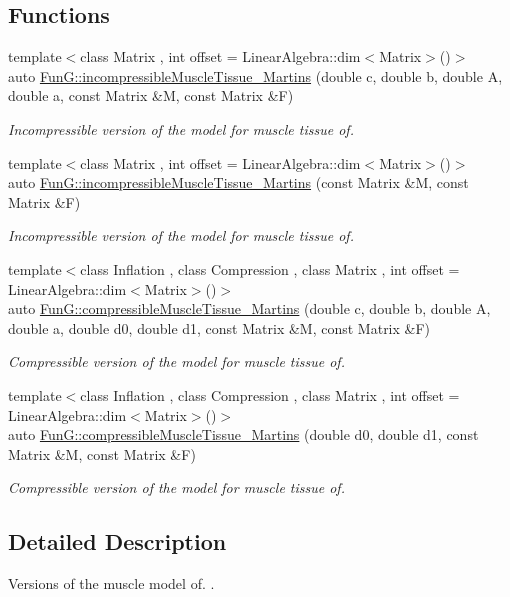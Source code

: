 \subsection*{\-Functions}
\begin{DoxyCompactItemize}
\item 
{\footnotesize template$<$class Matrix , int offset = \-Linear\-Algebra\-::dim$<$\-Matrix$>$()$>$ }\\auto \hyperlink{group__Biomechanics_gafcc36a1958899ca9246c4c1b3c9bfd85}{\-Fun\-G\-::incompressible\-Muscle\-Tissue\-\_\-\-Martins} (double c, double b, double \-A, double a, const \-Matrix \&\-M, const \-Matrix \&\-F)
\begin{DoxyCompactList}\small\item\em \-Incompressible version of the model for muscle tissue of. \end{DoxyCompactList}\item 
{\footnotesize template$<$class Matrix , int offset = \-Linear\-Algebra\-::dim$<$\-Matrix$>$()$>$ }\\auto \hyperlink{group__Biomechanics_ga9e414585a90b1988e9fa88d17d875055}{\-Fun\-G\-::incompressible\-Muscle\-Tissue\-\_\-\-Martins} (const \-Matrix \&\-M, const \-Matrix \&\-F)
\begin{DoxyCompactList}\small\item\em \-Incompressible version of the model for muscle tissue of. \end{DoxyCompactList}\item 
{\footnotesize template$<$class Inflation , class Compression , class Matrix , int offset = \-Linear\-Algebra\-::dim$<$\-Matrix$>$()$>$ }\\auto \hyperlink{group__Biomechanics_gad831914c493a3da04ed40c3c0ce87a62}{\-Fun\-G\-::compressible\-Muscle\-Tissue\-\_\-\-Martins} (double c, double b, double \-A, double a, double d0, double d1, const \-Matrix \&\-M, const \-Matrix \&\-F)
\begin{DoxyCompactList}\small\item\em \-Compressible version of the model for muscle tissue of. \end{DoxyCompactList}\item 
{\footnotesize template$<$class Inflation , class Compression , class Matrix , int offset = \-Linear\-Algebra\-::dim$<$\-Matrix$>$()$>$ }\\auto \hyperlink{group__Biomechanics_ga46a70ccb2285e12addad87b6a8aaaae8}{\-Fun\-G\-::compressible\-Muscle\-Tissue\-\_\-\-Martins} (double d0, double d1, const \-Matrix \&\-M, const \-Matrix \&\-F)
\begin{DoxyCompactList}\small\item\em \-Compressible version of the model for muscle tissue of. \end{DoxyCompactList}\end{DoxyCompactItemize}


\subsection{\-Detailed \-Description}
\-Versions of the muscle model of. \cite{Martins1998}. 
